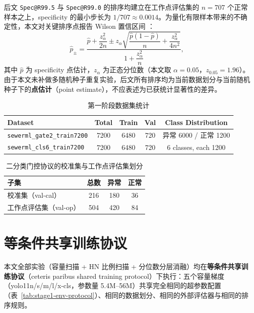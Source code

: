 \documentclass[UTF8,openany,12pt]{ctexbook}
\newcommand{\formalmetric}[1]{\texttt{#1}}
\begin{document}
后文 \formalmetric{Spec@R99.5} 与 \formalmetric{Spec@R99.0} 的排序均建立在工作点评估集的 $n = 707$ 个正常样本之上，specificity 的最小步长为 $1/707 \approx 0.0014$。为量化有限样本带来的不确定性，本文对关键排序点报告 Wilson 置信区间 \cite{wilson1927probable}：
\begin{equation}
\label{eq:wilson-ci}
\hat{p}_{\pm} = \frac{\hat{p} + \dfrac{z_\alpha^2}{2n} \pm z_\alpha\sqrt{\dfrac{\hat{p}(1-\hat{p})}{n} + \dfrac{z_\alpha^2}{4n^2}}}{\;1 + \dfrac{z_\alpha^2}{n}\;},
\end{equation}
其中 $\hat{p}$ 为 specificity 点估计，$z_\alpha$ 为正态分位数（本文取 $\alpha = 0.05$，$z_{0.05} = 1.96$）。由于本文未补做多随机种子重复实验，后文所有排序均为当前数据划分与当前随机种子下的\textbf{点估计}（point estimate），不应表述为已获统计显著性的差异。

\begin{table}[H]
    \centering
    \caption{第一阶段数据集统计}
    \label{tab:stage1-dataset-stats}
    \begin{tabular}{lcccc}
        \toprule
        Dataset & Total & Train & Val & Class Distribution \\
        \midrule
        \texttt{sewerml\_gate2\_train7200} & 7200 & 6480 & 720 & 异常 6000 / 正常 1200 \\
        \texttt{sewerml\_cls6\_train7200} & 7200 & 6480 & 720 & 6 classes, each 1200 \\
        \bottomrule
    \end{tabular}
\end{table}

\begin{table}[H]
    \centering
    \caption{二分类门控协议的校准集与工作点评估集划分}
    \label{tab:stage1-val-split}
    \begin{tabular}{lccc}
        \toprule
        子集 & 总数 & 异常 & 正常 \\
        \midrule
        校准集（val-cal） & 216 & 180 & 36 \\
        工作点评估集（val-op） & 504 & 420 & 84 \\
        \bottomrule
    \end{tabular}
\end{table}

\section{等条件共享训练协议}
\label{sec:shared-protocol}

本文全部实验（容量扫描 + HN 比例扫描 + 分位数分层消融）均在\textbf{等条件共享训练协议}（ceteris paribus shared training protocol）下执行：五个容量梯度（yolo11n/s/m/l/x-cls，参数量 5.4M--56M）共享完全相同的超参数配置（表~\ref{tab:stage1-env-protocol}）、相同的数据划分、相同的外部评估器与相同的排序规则。
\end{document}
